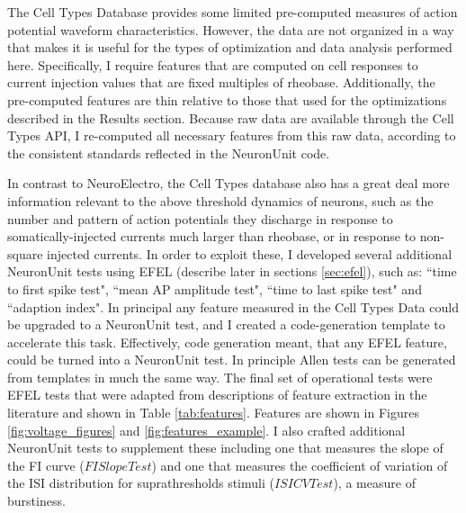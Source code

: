 The Cell Types Database provides some limited pre-computed measures of action potential waveform characteristics. 
However, the data are not organized in a way that makes it is useful for the types of optimization and data analysis performed here.
Specifically, I require features that are computed on cell responses to current injection values that are fixed multiples of rheobase.
Additionally, the pre-computed features are thin relative to those that used for the optimizations described in the Results section.
Because raw data are available through the Cell Types API, I re-computed all necessary features from this raw data, according to the consistent standards reflected in the NeuronUnit code.

In contrast to NeuroElectro, the Cell Types database also has a great deal more information relevant to the above threshold dynamics of neurons, such as the number and pattern of action potentials they discharge in response to somatically-injected currents much larger than rheobase, or in response to non-square injected currents.
In order to exploit these, I developed several additional NeuronUnit tests using EFEL (describe later in sections \ref{sec:efel}), such as: ``time to first spike test", ``mean AP amplitude test", ``time to last spike test" and ``adaption index". In principal any feature measured in the Cell Types Data could be upgraded to a NeuronUnit test, and I created a code-generation template to accelerate this task. Effectively, code generation meant, that any EFEL feature, could be turned into a NeuronUnit test. In principle Allen tests can be generated from templates in much the same way. The final set of operational tests
were EFEL \cite{EFEL} tests that were adapted from descriptions of feature extraction in the literature and shown in Table \ref{tab:features}. 
Features are shown in Figures \ref{fig:voltage_figures} and \ref{fig:features_example}.
I also crafted additional NeuronUnit tests to supplement these including one that measures the slope of the FI curve ($FISlopeTest$) and one that measures the coefficient of variation of the ISI distribution for suprathresholds stimuli ($ISICVTest$), a measure of burstiness. 



